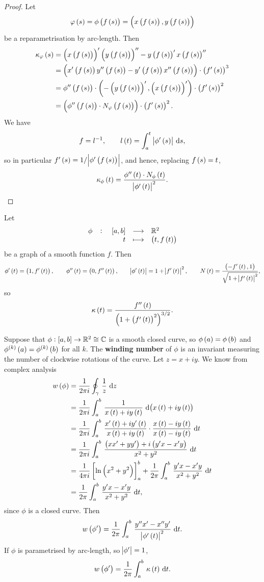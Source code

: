\begin{proof}
Let
$$ \varphi\br{s} = \phi\br{f\br{s}} = \br{x\br{f\br{s}}, y\br{f\br{s}}} $$
be a reparametrisation by arc-length. Then
\begin{align*}
\kappa_\varphi\br{s}
& = \br{x\br{f\br{s}}}'\br{y\br{f\br{s}}}'' - y\br{f\br{s}}'x\br{f\br{s}}'' \\
& = \br{x'\br{f\br{s}}y''\br{f\br{s}} - y'\br{f\br{s}}x''\br{f\br{s}}} \cdot \br{f'\br{s}}^3 \\
& = \phi''\br{f\br{s}} \cdot \br{-\br{y\br{f\br{s}}}', \br{x\br{f\br{s}}}'} \cdot \br{f'\br{s}}^2 \\
& = \br{\phi''\br{f\br{s}} \cdot N_\varphi\br{f\br{s}}} \cdot \br{f'\br{s}}^2.
\end{align*}
We have
$$ f = l^{-1}, \qquad l\br{t} = \intd{a}{t}{\abs{\phi'\br{s}}}{s}, $$
so in particular $ f'\br{s} = 1 / \abs{\phi'\br{f\br{s}}} $, and hence, replacing $ f\br{s} = t $,
$$ \kappa_\phi\br{t} = \dfrac{\phi''\br{t} \cdot N_\phi\br{t}}{\abs{\phi'\br{t}}^2}. $$
\end{proof}

\begin{example*}
Let
$$ \function[\phi]{\sbr{a, b}}{\R^2}{t}{\br{t, f\br{t}}} $$
be a graph of a smooth function $ f $. Then
$$ \phi'\br{t} = \br{1, f'\br{t}}, \qquad \phi''\br{t} = \br{0, f''\br{t}}, \qquad \abs{\phi'\br{t}} = 1 + \abs{f'\br{t}}^2, \qquad N\br{t} = \dfrac{\br{-f'\br{t}, 1}}{\sqrt{1 + \abs{f'\br{t}}^2}}, $$
so
$$ \kappa\br{t} = \dfrac{f''\br{t}}{\br{1 + \br{f'\br{t}}^2}^{3 / 2}}. $$
\end{example*}

\pagebreak

Suppose that $ \phi : \sbr{a, b} \to \R^2 \cong \C $ is a smooth closed curve, so $ \phi\br{a} = \phi\br{b} $ and $ \phi^{\br{k}}\br{a} = \phi^{\br{k}}\br{b} $ for all $ k $. The \textbf{winding number} of $ \phi $ is an invariant measuring the number of clockwise rotations of the curve. Let $ z = x + iy $. We know from complex analysis
\begin{align*}
w\br{\phi}
& = \dfrac{1}{2\pi i} \oint_\gamma \, \dfrac{1}{z} \, \dif z \\
& = \dfrac{1}{2\pi i} \intd{a}{b}{\dfrac{1}{x\br{t} + iy\br{t}}}{\br{x\br{t} + iy\br{t}}} \\
& = \dfrac{1}{2\pi i} \intd{a}{b}{\dfrac{x'\br{t} + iy'\br{t}}{x\br{t} + iy\br{t}} \cdot \dfrac{x\br{t} - iy\br{t}}{x\br{t} - iy\br{t}}}{t} \\
& = \dfrac{1}{2\pi i} \intd{a}{b}{\dfrac{\br{xx' + yy'} + i\br{y'x - x'y}}{x^2 + y^2}}{t} \\
& = \dfrac{1}{4\pi i} \sbr{\ln\br{x^2 + y^2}}_a^b + \dfrac{1}{2\pi} \intd{a}{b}{\dfrac{y'x - x'y}{x^2 + y^2}}{t} \\
& = \dfrac{1}{2\pi} \intd{a}{b}{\dfrac{y'x - x'y}{x^2 + y^2}}{t},
\end{align*}
since $ \phi $ is a closed curve. Then
$$ w\br{\phi'} = \dfrac{1}{2\pi} \intd{a}{b}{\dfrac{y''x' - x''y'}{\abs{\phi'\br{t}}^2}}{t}. $$
If $ \phi $ is parametrised by arc-length, so $ \abs{\phi'} = 1 $,
$$ w\br{\phi'} = \dfrac{1}{2\pi} \intd{a}{b}{\kappa\br{t}}{t}. $$

